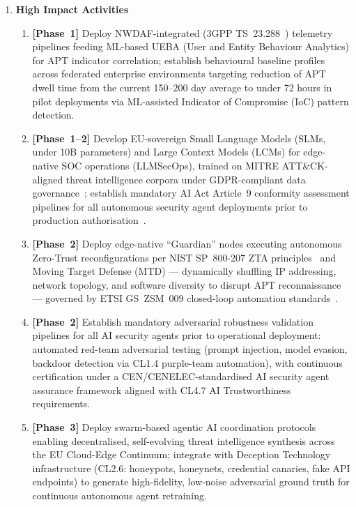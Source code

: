 \begin{enumerate}
\item \textbf{High Impact Activities}

\begin{enumerate}[label=(\alph*)]
  \item \textbf{[Phase~1]} Deploy NWDAF-integrated (3GPP TS~23.288~\cite{threeGPP23288})
        telemetry pipelines feeding ML-based UEBA (User and Entity Behaviour Analytics)
        for APT indicator correlation; establish behavioural baseline profiles across
        federated enterprise environments targeting reduction of APT dwell time from
        the current 150--200 day average to under 72 hours in pilot deployments via
        ML-assisted Indicator of Compromise (IoC) pattern detection.

  \item \textbf{[Phase~1--2]} Develop EU-sovereign Small Language Models (SLMs,
        under 10B parameters) and Large Context Models (LCMs) for edge-native SOC
        operations (LLMSecOps), trained on MITRE ATT\&CK-aligned threat intelligence
        corpora under GDPR-compliant data governance~\cite{gdpr}; establish mandatory
        AI Act Article~9 conformity assessment pipelines for all autonomous security
        agent deployments prior to production authorisation~\cite{aiact}.

  \item \textbf{[Phase~2]} Deploy edge-native ``Guardian'' nodes executing autonomous
        Zero-Trust reconfigurations per NIST SP~800-207 ZTA principles~\cite{nistsp800207}
        and Moving Target Defense (MTD) --- dynamically shuffling IP addressing, network
        topology, and software diversity to disrupt APT reconnaissance --- governed by
        ETSI GS~ZSM~009 closed-loop automation standards~\cite{etsizsm009}.

  \item \textbf{[Phase~2]} Establish mandatory adversarial robustness validation
        pipelines for all AI security agents prior to operational deployment: automated
        red-team adversarial testing (prompt injection, model evasion, backdoor
        detection via CL1.4 purple-team automation), with continuous certification
        under a CEN/CENELEC-standardised AI security agent assurance framework
        aligned with CL4.7 AI Trustworthiness requirements.

  \item \textbf{[Phase~3]} Deploy swarm-based agentic AI coordination protocols
        enabling decentralised, self-evolving threat intelligence synthesis across
        the EU Cloud-Edge Continuum; integrate with Deception Technology
        infrastructure (CL2.6: honeypots, honeynets, credential canaries, fake API
        endpoints) to generate high-fidelity, low-noise adversarial ground truth for
        continuous autonomous agent retraining.
\end{enumerate}


\end{enumerate}
